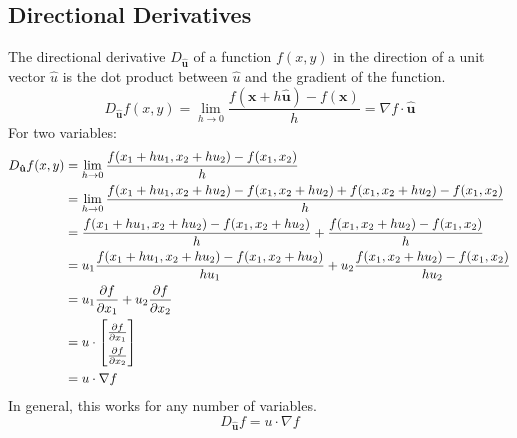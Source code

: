 \documentclass{article}
\theoremstyle{mytheoremstyle}
\theoremstyle{mytheoremstyle}
\theoremstyle{myproblemstyle}
\begin{document}
    \subsection*{Directional Derivatives}
    The directional derivative $D_\mathbf{\hat{u}}$ of a function $f(x,y)$ in
    the direction of a unit vector $\hat{u}$ is the dot product between
    $\hat{u}$ and the gradient of the function.
    \[
        D_\mathbf{\hat{u}} f(x,y) = \lim_{h\to 0} \frac{f(\mathbf{x} + h \mathbf{\hat{u}}) - f(\mathbf{x})}{h} = \nabla f \cdot \mathbf{\hat{u}}
    \]
    For two variables:
    \begin{align*}
        D_\mathbf{\hat{u}} f(x,y)
        &= \lim_{h\to 0} \frac{f(x_1+hu_1, x_2+hu_2) - f(x_1, x_2)}{h} \\
        &= \lim_{h\to 0} \frac{f(x_1+hu_1, x_2+hu_2) - f(x_1, x_2+hu_2) + f(x_1, x_2+hu_2) - f(x_1, x_2)}{h} \\
        &= \frac{f(x_1+hu_1, x_2+hu_2) - f(x_1, x_2+hu_2)}{h}
        + \frac{f(x_1, x_2+hu_2) - f(x_1,x_2)}{h} \\
        &= u_1\frac{f(x_1+hu_1, x_2+hu_2) - f(x_1, x_2+hu_2)}{hu_1}
        + u_2\frac{f(x_1, x_2+hu_2) - f(x_1,x_2)}{hu_2} \\
        &= u_1 \frac{\partial f}{\partial x_1} + u_2 \frac{\partial f}{\partial x_2} \\
        &= u \cdot \renewcommand{\arraystretch}{1.5}\begin{bmatrix}
            \frac{\partial f}{\partial x_1} \\
            \frac{\partial f}{\partial x_2}
        \end{bmatrix} \\
        &= u \cdot \nabla f
    \end{align*}
    In general, this works for any number of variables.
    \[
        D_\mathbf{\hat{u}} f = u \cdot \nabla f
    \]
\end{document}
